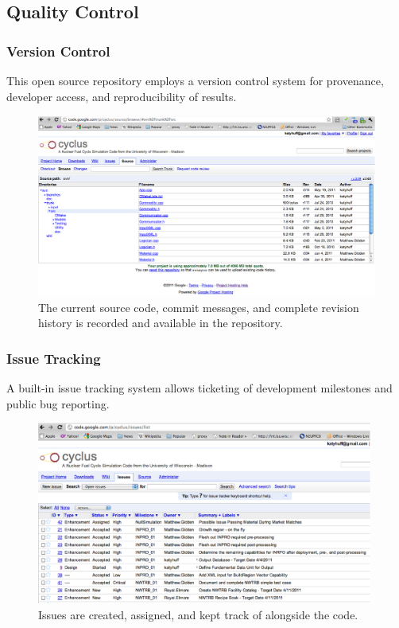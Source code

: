 \documentclass[9pt]{beamer}
\begin{document}
\subsection{Quality Control}
\begin{frame}[ctb!]
  \frametitle{Version Control}
    This open source repository employs a version control system 
     for provenance, developer access, and reproducibility of results.
  \begin{figure}[htbp!]
    \begin{center}
      \includegraphics[height=6cm]{source.eps}
    \end{center}
    \caption{The current source code, commit messages, and complete 
    revision history is recorded and available in the repository.}
    \label{fig:source}
  \end{figure}
\end{frame}
\begin{frame}[ctb!]
  \frametitle{Issue Tracking}
    A built-in issue tracking system allows ticketing of 
    development milestones and public bug reporting.
  \begin{figure}[htbp!]
    \begin{center}
      \includegraphics[height=6cm]{issues.eps}
    \end{center}
    \caption{ Issues are created, assigned, and kept track of 
    alongside the code. } 
    \label{fig:issues}
  \end{figure}
\end{frame}
\end{document}
